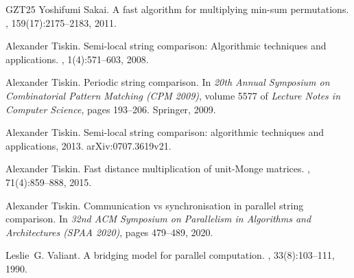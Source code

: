 \documentclass[10pt]{article}
\begin{document}
\begin{thebibliography}{GZT25}
Yoshifumi Sakai.
\newblock A fast algorithm for multiplying min-sum permutations.
, 159(17):2175--2183, 2011.

Alexander Tiskin.
\newblock Semi-local string comparison: Algorithmic techniques and
  applications.
, 1(4):571--603, 2008.

Alexander Tiskin.
\newblock Periodic string comparison.
\newblock In {\em 20th Annual Symposium on Combinatorial Pattern Matching (CPM
  2009)}, volume 5577 of {\em Lecture Notes in Computer Science}, pages
  193--206. Springer, 2009.

Alexander Tiskin.
\newblock Semi-local string comparison: algorithmic techniques and
  applications, 2013.
\newblock arXiv:0707.3619v21.

Alexander Tiskin.
\newblock Fast distance multiplication of unit-{M}onge matrices.
, 71(4):859--888, 2015.

Alexander Tiskin.
\newblock Communication vs synchronisation in parallel string comparison.
\newblock In {\em 32nd ACM Symposium on Parallelism in Algorithms and
  Architectures (SPAA 2020)}, pages 479--489, 2020.

Leslie~G. Valiant.
\newblock A bridging model for parallel computation.
, 33(8):103--111, 1990.

\end{thebibliography}
\end{document}
